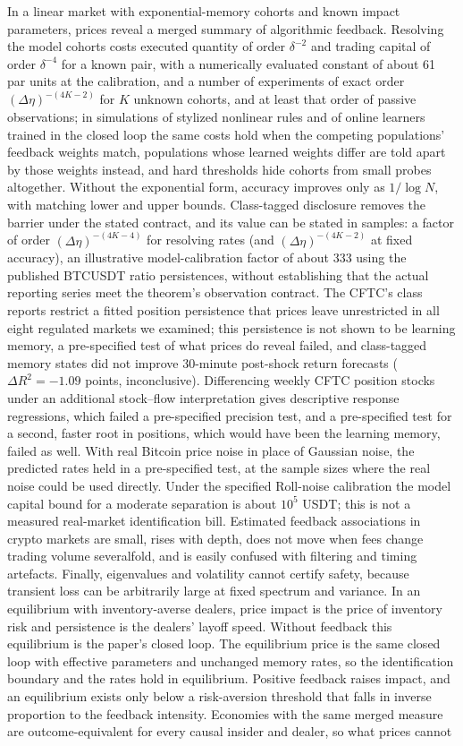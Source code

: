 \documentclass[12pt]{article}
\theoremstyle{definition}
\theoremstyle{remark}
\begin{document}
In a linear market with exponential-memory cohorts and known impact parameters, prices reveal a merged summary of algorithmic feedback. Resolving the model cohorts costs executed quantity of order $\delta^{-2}$ and trading capital of order $\delta^{-4}$ for a known pair, with a numerically evaluated constant of about 61 par units at the calibration, and a number of experiments of exact order $(\Delta\eta)^{-(4K-2)}$ for $K$ unknown cohorts, and at least that order of passive observations; in simulations of stylized nonlinear rules and of online learners trained in the closed loop the same costs hold when the competing populations' feedback weights match, populations whose learned weights differ are told apart by those weights instead, and hard thresholds hide cohorts from small probes altogether. Without the exponential form, accuracy improves only as $1/\log N$, with matching lower and upper bounds. Class-tagged disclosure removes the barrier under the stated contract, and its value can be stated in samples: a factor of order $(\Delta\eta)^{-(4K-4)}$ for resolving rates (and $(\Delta\eta)^{-(4K-2)}$ at fixed accuracy), an illustrative model-calibration factor of about 333 using the published BTCUSDT ratio persistences, without establishing that the actual reporting series meet the theorem's observation contract. The CFTC's class reports restrict a fitted position persistence that prices leave unrestricted in all eight regulated markets we examined; this persistence is not shown to be learning memory, a pre-specified test of what prices do reveal failed, and class-tagged memory states did not improve 30-minute post-shock return forecasts ($\Delta R^2=-1.09$ points, inconclusive). Differencing weekly CFTC position stocks under an additional stock--flow interpretation gives descriptive response regressions, which failed a pre-specified precision test, and a pre-specified test for a second, faster root in positions, which would have been the learning memory, failed as well. With real Bitcoin price noise in place of Gaussian noise, the predicted rates held in a pre-specified test, at the sample sizes where the real noise could be used directly. Under the specified Roll-noise calibration the model capital bound for a moderate separation is about $10^5$ USDT; this is not a measured real-market identification bill. Estimated feedback associations in crypto markets are small, rises with depth, does not move when fees change trading volume severalfold, and is easily confused with filtering and timing artefacts. Finally, eigenvalues and volatility cannot certify safety, because transient loss can be arbitrarily large at fixed spectrum and variance. In an equilibrium with inventory-averse dealers, price impact is the price of inventory risk and persistence is the dealers' layoff speed. Without feedback this equilibrium is the paper's closed loop. The equilibrium price is the same closed loop with effective parameters and unchanged memory rates, so the identification boundary and the rates hold in equilibrium. Positive feedback raises impact, and an equilibrium exists only below a risk-aversion threshold that falls in inverse proportion to the feedback intensity. Economies with the same merged measure are outcome-equivalent for every causal insider and dealer, so what prices cannot 
\end{document}
